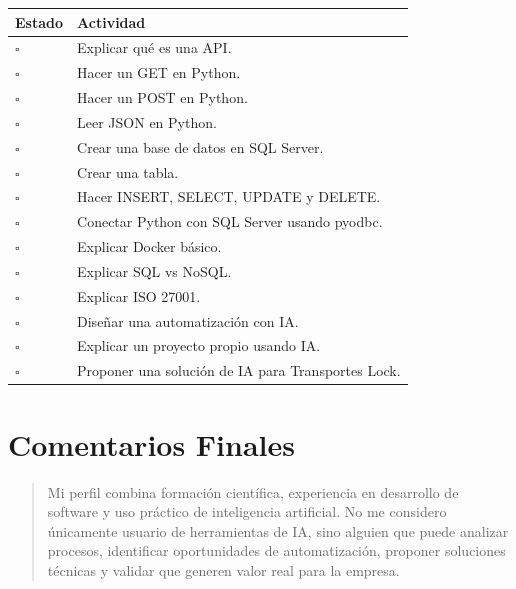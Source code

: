 \documentclass[12pt]{article}
\begin{document}
\begin{longtable}{|p{1.5cm}|p{10cm}|}
\hline
\textbf{Estado} & \textbf{Actividad} \\
\hline
$\square$ & Explicar qué es una API. \\
\hline
$\square$ & Hacer un GET en Python. \\
\hline
$\square$ & Hacer un POST en Python. \\
\hline
$\square$ & Leer JSON en Python. \\
\hline
$\square$ & Crear una base de datos en SQL Server. \\
\hline
$\square$ & Crear una tabla. \\
\hline
$\square$ & Hacer INSERT, SELECT, UPDATE y DELETE. \\
\hline
$\square$ & Conectar Python con SQL Server usando pyodbc. \\
\hline
$\square$ & Explicar Docker básico. \\
\hline
$\square$ & Explicar SQL vs NoSQL. \\
\hline
$\square$ & Explicar ISO 27001. \\
\hline
$\square$ & Diseñar una automatización con IA. \\
\hline
$\square$ & Explicar un proyecto propio usando IA. \\
\hline
$\square$ & Proponer una solución de IA para Transportes Lock. \\
\hline
\end{longtable}

\section{Comentarios Finales}

\begin{quote}
Mi perfil combina formación científica, experiencia en desarrollo de software y uso práctico de inteligencia artificial. No me considero únicamente usuario de herramientas de IA, sino alguien que puede analizar procesos, identificar oportunidades de automatización, proponer soluciones técnicas y validar que generen valor real para la empresa.
\end{quote}
\end{document}
